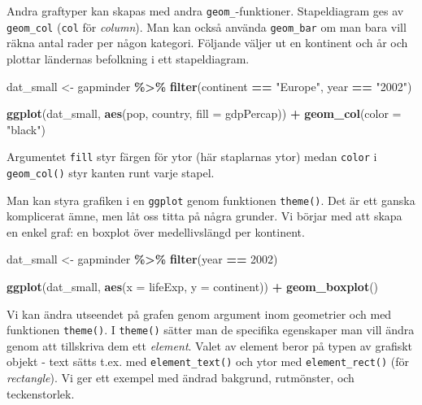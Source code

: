 \documentclass[
]{book}
\newenvironment{Shaded}{\begin{snugshade}}{\end{snugshade}}
\newcommand{\AttributeTok}[1]{\textcolor[rgb]{0.13,0.29,0.53}{#1}}
\newcommand{\DecValTok}[1]{\textcolor[rgb]{0.00,0.00,0.81}{#1}}
\newcommand{\FunctionTok}[1]{\textcolor[rgb]{0.13,0.29,0.53}{\textbf{#1}}}
\newcommand{\NormalTok}[1]{#1}
\newcommand{\OtherTok}[1]{\textcolor[rgb]{0.56,0.35,0.01}{#1}}
\newcommand{\SpecialCharTok}[1]{\textcolor[rgb]{0.81,0.36,0.00}{\textbf{#1}}}
\newcommand{\StringTok}[1]{\textcolor[rgb]{0.31,0.60,0.02}{#1}}
\theoremstyle{definition}
\theoremstyle{definition}
\theoremstyle{definition}
\theoremstyle{definition}
\theoremstyle{remark}
\begin{document}
Andra graftyper kan skapas med andra \texttt{geom\_}-funktioner. Stapeldiagram ges av \texttt{geom\_col} (\texttt{col} för \emph{column}). Man kan också använda \texttt{geom\_bar} om man bara vill räkna antal rader per någon kategori.
Följande väljer ut en kontinent och år och plottar ländernas befolkning i ett stapeldiagram.

\begin{Shaded}
\begin{Highlighting}[]
\NormalTok{dat\_small }\OtherTok{\textless{}{-}}\NormalTok{ gapminder }\SpecialCharTok{\%\textgreater{}\%} 
  \FunctionTok{filter}\NormalTok{(continent }\SpecialCharTok{==} \StringTok{"Europe"}\NormalTok{, year }\SpecialCharTok{==} \StringTok{"2002"}\NormalTok{)}

\FunctionTok{ggplot}\NormalTok{(dat\_small, }\FunctionTok{aes}\NormalTok{(pop, country, }\AttributeTok{fill =}\NormalTok{ gdpPercap)) }\SpecialCharTok{+}
  \FunctionTok{geom\_col}\NormalTok{(}\AttributeTok{color =} \StringTok{"black"}\NormalTok{)}
\end{Highlighting}
\end{Shaded}

Argumentet \texttt{fill} styr färgen för ytor (här staplarnas ytor) medan \texttt{color} i \texttt{geom\_col()} styr kanten runt varje stapel.

Man kan styra grafiken i en \texttt{ggplot} genom funktionen \texttt{theme()}. Det är ett ganska komplicerat ämne, men låt oss titta på några grunder. Vi börjar med att skapa en enkel graf: en boxplot över medellivslängd per kontinent.

\begin{Shaded}
\begin{Highlighting}[]
\NormalTok{dat\_small }\OtherTok{\textless{}{-}}\NormalTok{ gapminder }\SpecialCharTok{\%\textgreater{}\%} 
  \FunctionTok{filter}\NormalTok{(year }\SpecialCharTok{==} \DecValTok{2002}\NormalTok{)}

\FunctionTok{ggplot}\NormalTok{(dat\_small, }\FunctionTok{aes}\NormalTok{(}\AttributeTok{x =}\NormalTok{ lifeExp, }\AttributeTok{y =}\NormalTok{ continent)) }\SpecialCharTok{+} 
  \FunctionTok{geom\_boxplot}\NormalTok{()}
\end{Highlighting}
\end{Shaded}

Vi kan ändra utseendet på grafen genom argument inom geometrier och med funktionen \texttt{theme()}. I \texttt{theme()} sätter man de specifika egenskaper man vill ändra genom att tillskriva dem ett \emph{element}. Valet av element beror på typen av grafiskt objekt - text sätts t.ex. med \texttt{element\_text()} och ytor med \texttt{element\_rect()} (för \emph{rectangle}). Vi ger ett exempel med ändrad bakgrund, rutmönster, och teckenstorlek.
\end{document}
